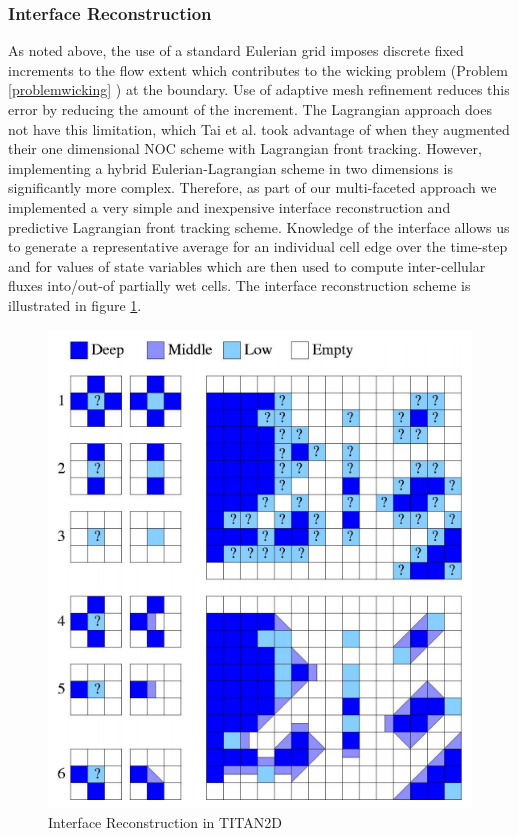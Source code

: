 \documentclass[letterpaper,10pt]{article}
\begin{document}
\subsubsection{Interface Reconstruction} \label{Interfacerecon}
As noted above, the use of a standard Eulerian grid imposes discrete 
fixed increments to the flow extent which contributes to the wicking problem
(Problem \ref{problemwicking} ) at the 
boundary.  Use of adaptive mesh refinement 
reduces this error by reducing the amount of the increment. 
The Lagrangian approach does not have this 
limitation, which Tai et al. \cite{Tai2002} took advantage
of when they augmented their one dimensional NOC scheme with 
Lagrangian front tracking.  However, implementing a hybrid 
Eulerian-Lagrangian scheme in two dimensions is significantly more 
complex. 
Therefore, as part of our multi-faceted approach we implemented a very 
simple and inexpensive interface reconstruction and predictive 
Lagrangian front tracking scheme.  Knowledge of the interface allows
us to generate a representative average for an individual cell edge 
over the time-step and for values of state variables which are then used to 
compute inter-cellular fluxes into/out-of partially wet cells.  The 
interface reconstruction scheme is illustrated in figure \ref{interface}.
\begin{figure}[!h]
        \centerline{\includegraphics[scale=0.3]{IMAGES/flux.png}}
        \caption{Interface Reconstruction in TITAN2D}
        \label{interface}
\end{figure} 
\end{document}
